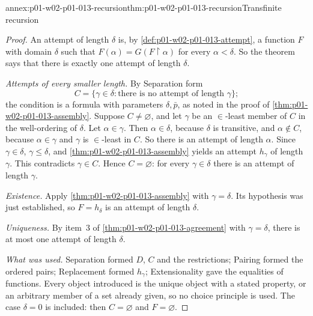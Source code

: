\begin{annexitem}{annex:p01-w02-p01-013-recursion}{thm:p01-w02-p01-013-recursion}{Transfinite recursion}
\begin{proof}
An attempt of length \(\delta\) is, by
\cref{def:p01-w02-p01-013-attempt}, a function \(F\) with domain \(\delta\)
such that \(F(\alpha)=G(F\mathbin{\upharpoonright}\alpha)\) for every
\(\alpha<\delta\). So the theorem says that there is exactly one attempt of
length \(\delta\).

\emph{Attempts of every smaller length.} By Separation form
\[
  C=\{\gamma\in\delta:\text{there is no attempt of length }\gamma\};
\]
the condition is a formula with parameters \(\delta,\bar p\), as noted in
the proof of \cref{thm:p01-w02-p01-013-assembly}. Suppose
\(C\ne\varnothing\), and let \(\gamma\) be an \(\in\)-least member of \(C\)
in the well-ordering of \(\delta\). Let \(\alpha\in\gamma\). Then
\(\alpha\in\delta\), because \(\delta\) is transitive, and
\(\alpha\notin C\), because \(\alpha\in\gamma\) and \(\gamma\) is
\(\in\)-least in \(C\). So there is an attempt of length \(\alpha\). Since
\(\gamma\in\delta\), \(\gamma\leq\delta\), and
\cref{thm:p01-w02-p01-013-assembly} yields an attempt \(h_\gamma\) of length
\(\gamma\). This contradicts \(\gamma\in C\). Hence \(C=\varnothing\): for
every \(\gamma\in\delta\) there is an attempt of length \(\gamma\).

\emph{Existence.} Apply \cref{thm:p01-w02-p01-013-assembly} with
\(\gamma=\delta\). Its hypothesis was just established, so
\(F=h_\delta\) is an attempt of length \(\delta\).

\emph{Uniqueness.} By item~3 of \cref{thm:p01-w02-p01-013-agreement} with
\(\gamma=\delta\), there is at most one attempt of length \(\delta\).

\emph{What was used.} Separation formed \(D\), \(C\) and the restrictions;
Pairing formed the ordered pairs; Replacement formed \(h_\gamma\);
Extensionality gave the equalities of functions. Every object introduced is
the unique object with a stated property, or an arbitrary member of a set
already given, so no choice principle is used. The case \(\delta=0\) is
included: then \(C=\varnothing\) and \(F=\varnothing\).
\end{proof}
\end{annexitem}

